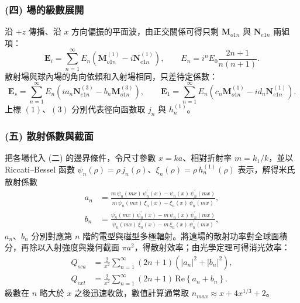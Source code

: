\subsubsection*{(四) 場的級數展開}
沿 $+z$ 傳播、沿 $x$ 方向偏振的平面波，由正交關係可得只剩 $\mathbf{M}_{o1n}$ 與 $\mathbf{N}_{e1n}$ 兩組項：
\begin{equation}
    \mathbf{E}_i = \sum_{n=1}^{\infty} E_n \left( \mathbf{M}^{(1)}_{o1n} - i \mathbf{N}^{(1)}_{e1n} \right), \qquad E_n = i^n E_0 \frac{2n+1}{n(n+1)} .
\end{equation}
散射場與球內場的角向依賴和入射場相同，只差待定係數：
\begin{equation}
    \mathbf{E}_s = \sum_{n=1}^{\infty} E_n \left( i a_n \mathbf{N}^{(3)}_{e1n} - b_n \mathbf{M}^{(3)}_{o1n} \right), \qquad
    \mathbf{E}_1 = \sum_{n=1}^{\infty} E_n \left( c_n \mathbf{M}^{(1)}_{o1n} - i d_n \mathbf{N}^{(1)}_{e1n} \right) .
\end{equation}
上標 $(1)$、$(3)$ 分別代表徑向函數取 $j_n$ 與 $h_n^{(1)}$。

\subsubsection*{(五) 散射係數與截面}
把各場代入 (二) 的邊界條件，令尺寸參數 $x = ka$、相對折射率 $m = k_1/k$，並以 Riccati--Bessel 函數 $\psi_n(\rho) = \rho\, j_n(\rho)$、$\xi_n(\rho) = \rho\, h_n^{(1)}(\rho)$ 表示，解得米氏散射係數
\begin{align}
    a_n &= \frac{m\, \psi_n(mx)\, \psi_n^{\prime}(x) - \psi_n(x)\, \psi_n^{\prime}(mx)}{m\, \psi_n(mx)\, \xi_n^{\prime}(x) - \xi_n(x)\, \psi_n^{\prime}(mx)}, \\
    b_n &= \frac{\psi_n(mx)\, \psi_n^{\prime}(x) - m\, \psi_n(x)\, \psi_n^{\prime}(mx)}{\psi_n(mx)\, \xi_n^{\prime}(x) - m\, \xi_n(x)\, \psi_n^{\prime}(mx)} ,
\end{align}
$a_n$、$b_n$ 分別對應第 $n$ 階的電型與磁型多極輻射。將遠場的散射功率對全球面積分，再除以入射強度與幾何截面 $\pi a^2$，得散射效率；由光學定理可得消光效率：
\begin{equation}
    \begin{aligned}
    Q_{sca} &= \frac{2}{x^2} \sum_{n=1}^{\infty}(2n+1)\left(|a_n|^2+|b_n|^2\right), \\
    Q_{ext} &= \frac{2}{x^2} \sum_{n=1}^{\infty} (2n+1)\, \mathrm{Re}\left\{ a_n + b_n \right\} .
    \end{aligned}
    \label{eq:Qsca_proof}
\end{equation}
級數在 $n$ 略大於 $x$ 之後迅速收斂，數值計算通常取 $n_{max} \approx x + 4x^{1/3} + 2$\parencite{bohren1983Absorption}。
